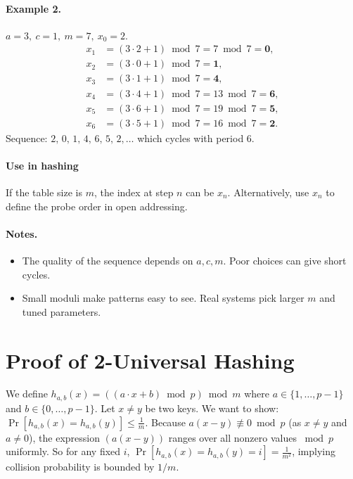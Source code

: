 \documentclass[11pt]{article}
\begin{document}
\medskip
\paragraph{Example 2.} \(a=3,\ c=1,\ m=7,\ x_0=2\).
\[
\begin{aligned}
x_1 &= (3\cdot 2 + 1)\bmod 7 = 7\bmod 7 = \mathbf{0},\\
x_2 &= (3\cdot 0 + 1)\bmod 7 = \mathbf{1},\\
x_3 &= (3\cdot 1 + 1)\bmod 7 = \mathbf{4},\\
x_4 &= (3\cdot 4 + 1)\bmod 7 = 13\bmod 7 = \mathbf{6},\\
x_5 &= (3\cdot 6 + 1)\bmod 7 = 19\bmod 7 = \mathbf{5},\\
x_6 &= (3\cdot 5 + 1)\bmod 7 = 16\bmod 7 = \mathbf{2}.
\end{aligned}
\]
Sequence: \(2,\,0,\,1,\,4,\,6,\,5,\,2,\dots\) which cycles with period \(6\).

\medskip
\paragraph{Use in hashing}
If the table size is \(m\), the index at step \(n\) can be \(x_n\).
Alternatively, use \(x_n\) to define the probe order in open addressing.

\medskip
\paragraph{Notes.}
\begin{itemize}
  \item The quality of the sequence depends on \(a,c,m\). Poor choices can give short cycles.
  \item Small moduli make patterns easy to see. Real systems pick larger \(m\) and tuned parameters.
\end{itemize}

\section{Proof of 2-Universal Hashing}
We define $h_{a,b}(x) = ((a \cdot x + b) \bmod p) \bmod m$ where $a \in \{1,\ldots,p-1\}$ and $b \in \{0,\ldots,p-1\}$. 
Let $x \neq y$ be two keys. We want to show: $\Pr[h_{a,b}(x) = h_{a,b}(y)] \leq \frac{1}{m}$.
Because $a(x - y) \not\equiv 0 \bmod p$ (as $x \neq y$ and $a \neq 0$), the expression $(a(x-y))$ ranges over all nonzero values $\bmod p$ uniformly.
So for any fixed $i$, $\Pr[h_{a,b}(x) = h_{a,b}(y) = i] = \frac{1}{m^2}$, implying collision probability is bounded by $1/m$.
\end{document}
